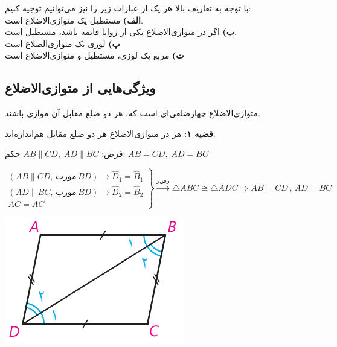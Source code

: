 \documentclass[12pt, a4paper]{book}
\begin{document}
با توجه به تعاریف بالا هر یک از عبارات زیر را نیز می‌توانیم توجیه کنیم: \smallskip\\
\textbf{الف)} مستطیل یک متوازی‌الاضلاع است.\\
\textbf{ب)} اگر در متوازی‌الاضلاع یکی از زوایا قائمه باشد، مستطیل است.\\
\textbf{پ)} لوزی یک متوازی‌الضلاع است\\
\textbf{ت)} مربع یک لوزی، مستطیل و متوازی‌الاضلاع است\\

\subsection{ویژگی‌هایی از متوازی‌الاضلاع}
متوازی‌الاضلاع چهارضلعی‌ای است که، هر دو ضلع مقابل آن موازی باشند.
\newline

\textbf{قضیه ۱:} هر در متوازی‌الاضلاع هر دو ضلع مقابل هم‌اندازه‌اند.

	\begin{minipage}{.7\textwidth}
		\centering فرض: 
		$AB \parallel CD, \; AD \parallel BC$
		\qquad حکم:
		$AB = CD, \; AD = BC$
	\begin{flushleft}
			$ \left. \begin{array}{rll}
		(AB \parallel CD, \, \text{مورب} \, BD ) \rightarrow \widehat{D}_1 = \widehat{B}_1 \\ (AD \parallel BC, \, \text{مورب} \, BD ) \rightarrow \widehat{D}_2 = \widehat{B}_2 \\ AC =AC
		\end{array} \right\} \xrightarrow{\text{زض‌ز}} \triangle ABC \cong  \triangle ADC 
		\Rightarrow AB = CD \, , \, AD = BC$
	\end{flushleft}
\end{minipage}
\begin{minipage}{.28\textwidth}
	\begin{flushleft}
		\includegraphics{"Shapes/Fasl - 3/Dars 1/qazie 1.pdf"}
	\end{flushleft}
\end{minipage}
\newline \bigskip \bigskip
\end{document}
